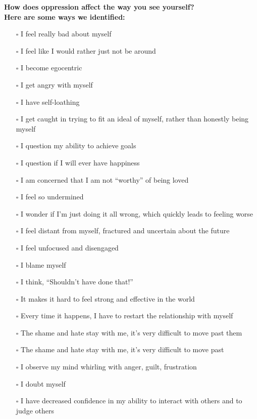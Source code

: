 \noindent\textcolor{ProcessBlue}{\textbf{\Large{How does oppression affect the way you see yourself?}}}\\
\textbf{\large{Here are some ways we identified:}}
\begin{multicols}{2}
\begin{itemize}
\item[$\square$]{I feel really bad about myself}
\item[$\square$]{I feel like I would rather just not be around}
\item[$\square$]{I become egocentric}
\item[$\square$]{I get angry with myself}
\item[$\square$]{I have self-loathing}
\item[$\square$]{I get caught in trying to fit an ideal of myself, rather than honestly being myself}
\item[$\square$]{I question my ability to achieve goals}
\item[$\square$]{I question if I will ever have happiness}
\item[$\square$]{I am concerned that I am not “worthy” of being loved}
\item[$\square$]{I feel so undermined}
\item[$\square$]{I wonder if I’m just doing it all wrong, which quickly leads to feeling worse}
\item[$\square$]{I feel distant from myself, fractured and uncertain about the future}
\item[$\square$]{I feel unfocused and disengaged}
\item[$\square$]{I blame myself}
\item[$\square$]{I think, “Shouldn’t have done that!”}
\item[$\square$]{It makes it hard to feel strong and effective in the world}
\item[$\square$]{Every time it happens, I have to restart the relationship with myself}
\item[$\square$]{The shame and hate stay with me, it’s very difficult to move past them}
\item[$\square$]{The shame and hate stay with me, it’s very difficult to move past}
\item[$\square$]{I observe my mind whirling with anger, guilt, frustration}
\item[$\square$]{I doubt myself}
\item[$\square$]{I have decreased confidence in my ability to interact with others and to judge others}

\end{itemize}
\end{multicols}
